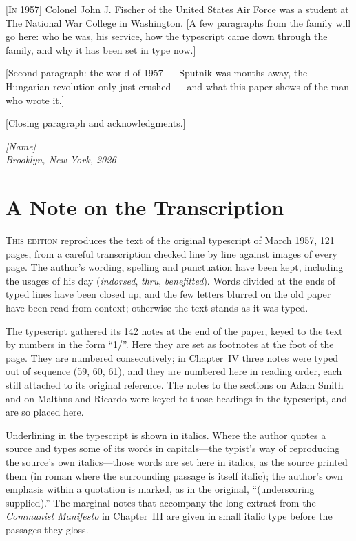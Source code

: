 \noindent\textsc{[In 1957]} Colonel John J. Fischer of the United States Air Force was a student at The National War College in Washington. [A few paragraphs from the family will go here: who he was, his service, how the typescript came down through the family, and why it has been set in type now.]

[Second paragraph: the world of 1957 --- Sputnik was months away, the Hungarian revolution only just crushed --- and what this paper shows of the man who wrote it.]

[Closing paragraph and acknowledgments.]

\vspace{1.2\onelineskip}
\begin{flushright}\itshape [Name]\\ Brooklyn, New York, 2026\end{flushright}

{\setlength{\beforechapskip}{0.45in}\setlength{\afterchapskip}{1.4\onelineskip}
\chapter{A Note on the Transcription}
}

\noindent\textsc{This edition} reproduces the text of the original typescript of March 1957, 121 pages, from a careful transcription checked line by line against images of every page. The author’s wording, spelling and punctuation have been kept, including the usages of his day (\textit{indorsed}, \textit{thru}, \textit{benefitted}). Words divided at the ends of typed lines have been closed up, and the few letters blurred on the old paper have been read from context; otherwise the text stands as it was typed.

The typescript gathered its 142 notes at the end of the paper, keyed to the text by numbers in the form “1/”. Here they are set as footnotes at the foot of the page. They are numbered consecutively; in Chapter~IV three notes were typed out of sequence (59, 60, 61), and they are numbered here in reading order, each still attached to its original reference. The notes to the sections on Adam Smith and on Malthus and Ricardo were keyed to those headings in the typescript, and are so placed here.

Underlining in the typescript is shown in italics. Where the author quotes a source and types some of its words in capitals---the typist’s way of reproducing the source’s own italics---those words are set here in italics, as the source printed them (in roman where the surrounding passage is itself italic); the author’s own emphasis within a quotation is marked, as in the original, “(underscoring supplied).” The marginal notes that accompany the long extract from the \textit{Communist Manifesto} in Chapter~III are given in small italic type before the passages they gloss.

